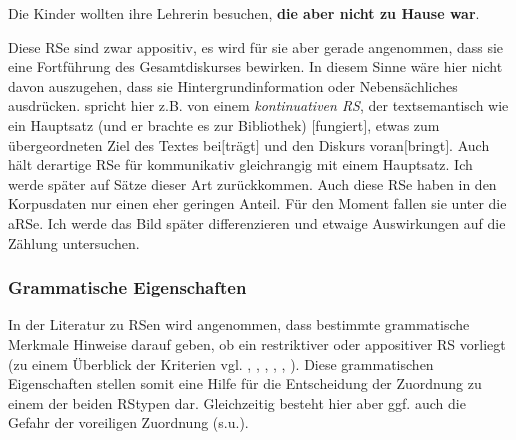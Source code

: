 \begin{exe}
	\ex\label{730} 
	Die Kinder wollten ihre Lehrerin besuchen, \textbf{die aber nicht zu Hause war}.
	\newline
	\hbox{}\hfill\hbox{\citet[85]{Holler2005}}
\end{exe}
Diese RSe sind zwar appositiv, es wird für sie aber gerade angenommen, dass sie eine Fortführung des Gesamtdiskurses bewirken. In diesem Sinne wäre hier nicht davon auszugehen, dass sie Hintergrundinformation oder Nebensächliches ausdrücken. \citet[272-273]{Lehmann1984} spricht hier z.B. von einem \textit{kontinuativen RS}, der \glqq textsemantisch wie ein Hauptsatz\grqq{} (\glq und er brachte es zur Bibliothek\grq {}) $[$fungiert$]$, \glqq etwas zum übergeordneten Ziel des Textes bei$[$trägt$]$\grqq{}  und  \glqq den Dis\-kurs voran$[$bringt$]$\grqq{}. Auch \citet[70]{Brandt1990} hält derartige RSe für  \glqq kommunikativ gleichrangig mit einem Hauptsatz\grqq{}. Ich werde später auf Sätze dieser Art zurückkommen. Auch diese RSe haben in den Korpusdaten nur einen eher geringen Anteil. Für den Moment fallen sie unter die aRSe. Ich werde das Bild später differenzieren und etwaige Auswirkungen auf die Zählung untersuchen.

\subsubsection{Grammatische Eigenschaften}
In der Literatur zu RSen wird angenommen, dass bestimmte grammatische Merkmale Hinweise darauf geben, ob ein restriktiver oder appositiver RS vorliegt (zu einem Überblick der Kriterien vgl. \citealt[182-183]{Schaffranietz1997}, \citealt{Becker1978}, \citealt[25-40]{Holler2005}, \citealt[32-51]{Birkner2008}, \citealt[263-267]{Lehmann1984}, \citealt[62-69]{Zifonun2001}). Diese grammatischen Eigenschaften stellen somit eine Hilfe für die Entscheidung der Zuordnung zu einem der beiden RStypen dar. Gleichzeitig besteht hier aber ggf. auch die Gefahr der voreiligen Zuordnung (s.u.).

